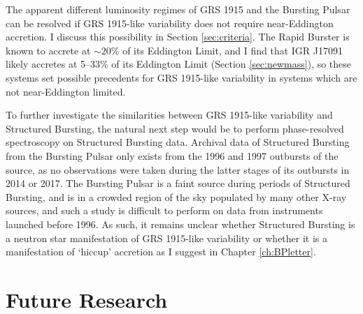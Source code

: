 \par The apparent different luminosity regimes of GRS 1915 and the Bursting Pulsar can be resolved if GRS 1915-like variability does not require near-Eddington accretion.  I discuss this possibility in Section \ref{sec:criteria}.  The Rapid Burster is known to accrete at $\sim20$\% of its Eddington Limit, and I find that IGR J17091 likely accretes at 5--33\% of its Eddington Limit (Section \ref{sec:newmass}), so these systems set possible precedents for GRS 1915-like variability in systems which are not near-Eddington limited.
\par To further investigate the similarities between GRS 1915-like variability and Structured Bursting, the natural next step would be to perform phase-resolved spectroscopy on Structured Bursting data.  Archival data of Structured Bursting from the Bursting Pulsar only exists from the 1996 and 1997 outbursts of the source, as no observations were taken during the latter stages of its outbursts in 2014 or 2017.  The Bursting Pulsar is a faint source during periods of Structured Bursting, and is in a crowded region of the sky populated by many other X-ray sources, and such a study is difficult to perform on data from instruments launched before 1996.  As such, it remains unclear whether Structured Bursting is a neutron star manifestation of GRS 1915-like variability or whether it is a manifestation of `hiccup' accretion as I suggest in Chapter \ref{ch:BPletter}.

\section{Future Research}

